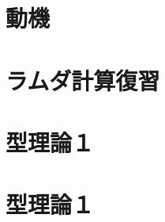 \documentclass[dvipdfmx]{jsarticle}
\begin{document}
\section{動機}

\newpage

\section{ラムダ計算復習}

\newpage

\section{型理論１}

\newpage

\section{型理論１}

\newpage

\end{document}
